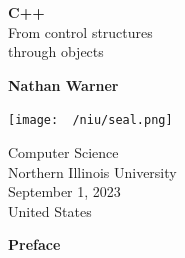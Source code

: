 \documentclass{report}
\title{\Huge{}}
\author{\huge{Nathan Warner}}
\date{\huge{}}
\begin{document}
        \begin{titlepage}
       \begin{center}
           \vspace*{1cm}
    
           \textbf{C++} \\
           From control structures  \\ through objects
    
           \vspace{0.5cm}
            
                
           \vspace{1.5cm}
    
           \textbf{Nathan Warner}
    
           \vfill
                
                
           \vspace{0.8cm}
         
           \texttt{[image: ~/niu/seal.png]}
                
           Computer Science \\
           Northern Illinois University\\
           September 1, 2023 \\
           United States\\
           
                
       \end{center}
    \end{titlepage}
    \tableofcontents
    \pagebreak \bigbreak \noindent
    \begin{center}
        \begin{Huge}
           \textbf{Preface} 
        \end{Huge}
    \end{center}
    \bigbreak \noindent 
    
\end{document}
